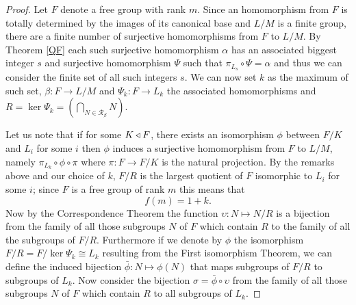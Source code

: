 \begin{proof}
    Let $F$ denote a free group with rank $m$. Since an homomorphism from $F$ is totally determined by the images of its canonical base and $L/M$ is a finite group, there are a finite number of surjective homomorphisms from $F$ to $L/M$. By Theorem \ref{QF} each such surjective homomorphism $\alpha$ has an associated biggest integer $s$ and surjective homomorphism $\Psi$ such that $\pi_{L_s} \circ \Psi = \alpha$ and thus we can consider the finite set of all such integers $s$. We can now set $k$ as the maximum of such set, $\beta \colon F \rightarrow L/M$ and $\Psi_k \colon F \rightarrow L_k$ the associated homomorphisms and $R = \ker \Psi_k = (\bigcap_{N \in \mathscr{R}_\beta}N)$.
    
    Let us note that if for some $K \triangleleft F$, there exists an isomorphism $\phi$ between $F/K$ and $L_i$ for some $i$ then $\phi$ induces a surjective homomorphism from $F$ to $L/M$, namely $\pi_{L_k} \circ \phi \circ \pi$ where $\pi \colon F \rightarrow F/K$ is the natural projection.
    By the remarks above and our choice of $k$, $F/R$ is the largest quotient of $F$ isomorphic to $L_i$ for some $i$; since $F$ is a free group of rank $m$ this means that 
    $$
    f(m) = 1 + k.
    $$
    Now by the Correspondence Theorem the function $\upsilon \colon N \mapsto N/R$ is a bijection from the family of all those subgroups $N$ of $F$ which contain $R$ to the family of all the subgroups of $F/R$. Furthermore if we denote by $\phi$ the isomorphism $F/R = F/\ker \Psi_k \cong L_k$ resulting from the First isomorphism Theorem, we can define the induced bijection $\bar{\phi} \colon N \mapsto \phi(N)$ that maps subgroups of $F/R$ to subgroups of $L_k$. Now consider the bijection $\sigma = \bar{\phi} \circ \upsilon$ from the family of all those subgroups $N$ of $F$ which contain $R$ to all subgroups of $L_k$. 
    

\end{proof}
